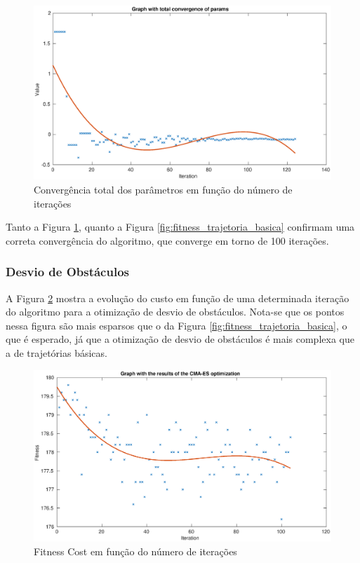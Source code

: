 \documentclass[a4paper,12pt]{article}
\begin{document}
\begin{figure}[H]
	\centering
	\includegraphics[width=1.0\textwidth]{figures/CMA-ES_Total_parameter_convergence.eps}
	\caption{Convergência total dos parâmetros em função do número de iterações}
	\label{fig:convergencia_total_trajetoria_basica}
\end{figure}

Tanto a Figura \ref{fig:convergencia_total_trajetoria_basica}, quanto a Figura \ref{fig:fitness_trajetoria_basica} confirmam uma correta convergência do algoritmo, que converge em torno de 100 iterações.

\subsubsection{Desvio de Obstáculos}

A Figura \ref{fig:fitness_trajetoria_basica_ally} mostra a evolução do custo em função de uma determinada iteração do algoritmo para a otimização de desvio de obstáculos. Nota-se que os pontos nessa figura são mais esparsos que o da Figura \ref{fig:fitness_trajetoria_basica}, o que é esperado, já que a otimização de desvio de obstáculos é mais complexa que a de trajetórias básicas.

\begin{figure}[H]
	\centering
	\includegraphics[width=1.0\textwidth]{figures/CMA-ES_Fitness_Results_ally.eps}
	\caption{Fitness Cost em função do número de iterações}
	\label{fig:fitness_trajetoria_basica_ally}
\end{figure}
\end{document}
